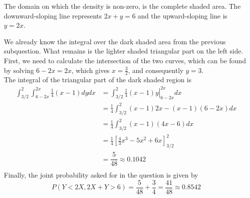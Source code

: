 \begin{exercise}
\begin{solution}
\begin{center}
            \end{center}
            The domain on which the density is non-zero, is the complete shaded area. The downward-sloping line represents $2x+y=6$ and the upward-sloping line is $y=2x$.

            We already know the integral over the dark shaded area from the previous subquestion. What remains is the lighter shaded triangular part on the left side.\\

                First, we need to calculate the intersection of the two curves, which can be found by solving $6-2x = 2x$, which gives $x= \frac{3}{2}$, and consequently $y = 3$.\\

            The integral of the triangular part of the dark shaded region is
            \begin{align*}
                \int_{3/2}^{2}\int_{6-2x}^{2x}\frac{1}{4}(x-1)dydx &= \int_{3/2}^{2}\left.\frac{1}{4}(x-1)y\right|_{6-2x}^{2x}dx\\
                &=\frac{1}{4}\int_{3/2}^{2}(x-1)2x-(x-1)(6-2x)dx\\
                &=\frac{1}{4}\int_{3/2}^{2}(x-1)(4x-6)dx\\
                &=\frac{1}{4}[\frac{4}{3}x^3-5x^2+6x]^{2}_{3/2}\\
                &=\dfrac{5}{48}\approx 0.1042\\
            \end{align*}
            Finally, the joint probability asked for in the question is given by
            $$P(Y<2X, 2X+Y>6) = \dfrac{5}{48}+\frac{3}{4} = \dfrac{41}{48}\approx 0.8542$$


\end{solution}
\end{exercise}

